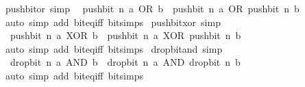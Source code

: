 \begin{isabellebody}
\endisatagproof
{\isafoldproof}%
%
\isadelimproof
\isanewline
%
\endisadelimproof
\isanewline
{}\isamarkupfalse%
\ push{\isacharunderscore}{\kern0pt}bit{\isacharunderscore}{\kern0pt}or\ {\isacharbrackleft}{\kern0pt}simp{\isacharbrackright}{\kern0pt}{\isacharcolon}{\kern0pt}\isanewline
\ \ {\isacartoucheopen}push{\isacharunderscore}{\kern0pt}bit\ n\ {\isacharparenleft}{\kern0pt}a\ OR\ b{\isacharparenright}{\kern0pt}\ {\isacharequal}{\kern0pt}\ push{\isacharunderscore}{\kern0pt}bit\ n\ a\ OR\ push{\isacharunderscore}{\kern0pt}bit\ n\ b{\isacartoucheclose}\isanewline
%
\isadelimproof
\ \ %
\endisadelimproof
%
\isatagproof
{}\isamarkupfalse%
\ {\isacharparenleft}{\kern0pt}auto\ simp\ add{\isacharcolon}{\kern0pt}\ bit{\isacharunderscore}{\kern0pt}eq{\isacharunderscore}{\kern0pt}iff\ bit{\isacharunderscore}{\kern0pt}simps{\isacharparenright}{\kern0pt}%
\endisatagproof
{\isafoldproof}%
%
\isadelimproof
\isanewline
%
\endisadelimproof
\isanewline
{}\isamarkupfalse%
\ push{\isacharunderscore}{\kern0pt}bit{\isacharunderscore}{\kern0pt}xor\ {\isacharbrackleft}{\kern0pt}simp{\isacharbrackright}{\kern0pt}{\isacharcolon}{\kern0pt}\isanewline
\ \ {\isacartoucheopen}push{\isacharunderscore}{\kern0pt}bit\ n\ {\isacharparenleft}{\kern0pt}a\ XOR\ b{\isacharparenright}{\kern0pt}\ {\isacharequal}{\kern0pt}\ push{\isacharunderscore}{\kern0pt}bit\ n\ a\ XOR\ push{\isacharunderscore}{\kern0pt}bit\ n\ b{\isacartoucheclose}\isanewline
%
\isadelimproof
\ \ %
\endisadelimproof
%
\isatagproof
{}\isamarkupfalse%
\ {\isacharparenleft}{\kern0pt}auto\ simp\ add{\isacharcolon}{\kern0pt}\ bit{\isacharunderscore}{\kern0pt}eq{\isacharunderscore}{\kern0pt}iff\ bit{\isacharunderscore}{\kern0pt}simps{\isacharparenright}{\kern0pt}%
\endisatagproof
{\isafoldproof}%
%
\isadelimproof
\isanewline
%
\endisadelimproof
\isanewline
{}\isamarkupfalse%
\ drop{\isacharunderscore}{\kern0pt}bit{\isacharunderscore}{\kern0pt}and\ {\isacharbrackleft}{\kern0pt}simp{\isacharbrackright}{\kern0pt}{\isacharcolon}{\kern0pt}\isanewline
\ \ {\isacartoucheopen}drop{\isacharunderscore}{\kern0pt}bit\ n\ {\isacharparenleft}{\kern0pt}a\ AND\ b{\isacharparenright}{\kern0pt}\ {\isacharequal}{\kern0pt}\ drop{\isacharunderscore}{\kern0pt}bit\ n\ a\ AND\ drop{\isacharunderscore}{\kern0pt}bit\ n\ b{\isacartoucheclose}\isanewline
%
\isadelimproof
\ \ %
\endisadelimproof
%
\isatagproof
{}\isamarkupfalse%
\ {\isacharparenleft}{\kern0pt}auto\ simp\ add{\isacharcolon}{\kern0pt}\ bit{\isacharunderscore}{\kern0pt}eq{\isacharunderscore}{\kern0pt}iff\ bit{\isacharunderscore}{\kern0pt}simps{\isacharparenright}{\kern0pt}%

\end{isabellebody}
